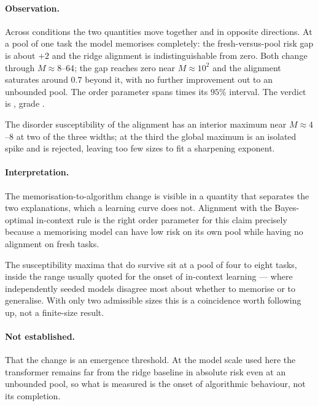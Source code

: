 
\paragraph{Observation.}
Across \AtlasIclTaskDiversityConditions{} conditions the two quantities move
together and in opposite directions. At a pool of one task the model memorises
completely: the fresh-versus-pool risk gap is about $+2$ and the ridge
alignment is indistinguishable from zero. Both change through
$M\approx8$--$64$; the gap reaches zero near $M\approx10^2$ and the alignment
saturates around $0.7$ beyond it, with no further improvement out to an
unbounded pool. The order parameter spans
\AtlasIclTaskDiversitySemanticRatio{} times its $95\%$ interval. The verdict is
\emph{\AtlasIclTaskDiversityVerdict{}}, grade
\AtlasIclTaskDiversityGrade{}.

The disorder susceptibility of the alignment has an interior maximum near
$M\approx4$--$8$ at two of the three widths; at the third the global maximum is
an isolated spike and is rejected, leaving too few sizes to fit a sharpening
exponent.

\paragraph{Interpretation.}
The memorisation-to-algorithm change is visible in a quantity that separates
the two explanations, which a learning curve does not. Alignment with the
Bayes-optimal in-context rule is the right order parameter for this claim
precisely because a memorising model can have low risk on its own pool while
having no alignment on fresh tasks.

The susceptibility maxima that do survive sit at a pool of four to eight tasks,
inside the range usually quoted for the onset of in-context learning --- where
independently seeded models disagree most about whether to memorise or to
generalise. With only two admissible sizes this is a coincidence worth
following up, not a finite-size result.

\paragraph{Not established.}
That the change is an emergence threshold. At the model scale used here the
transformer remains far from the ridge baseline in absolute risk even at an
unbounded pool, so what is measured is the onset of algorithmic behaviour, not
its completion.


